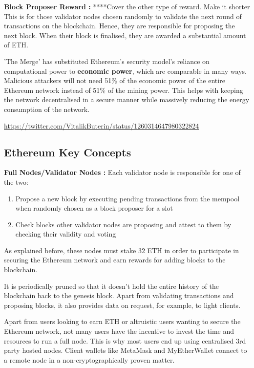 \textbf{Block Proposer Reward :}
****Cover the other type of reward. Make it shorter
This is for those validator nodes chosen randomly to validate the next round of transactions on the blockchain. Hence, they are responsible for proposing the next block. When their block is finalised, they are awarded a substantial amount of ETH.


'The Merge' has substituted Ethereum's security model's reliance on computational power to \textbf{economic power}, which are comparable in many ways. Malicious attackers will not need 51\% of the economic power of the entire Ethereum network instead of 51\% of the mining power. This helps with keeping the network decentralised in a secure manner while massively reducing the energy consumption of the network. 

\url{https://twitter.com/VitalikButerin/status/1260314647980322824}



\subsection{Ethereum Key Concepts}

\textbf{Full Nodes/Validator Nodes :}
Each validator node is responsible for one of the two:
\begin{enumerate}
    \item Propose a new block by executing pending transactions from the mempool when randomly chosen as a block proposer for a slot
    \item Check blocks other validator nodes are proposing and attest to them by checking their validity and voting 
\end{enumerate}
As explained before, these nodes must stake 32 ETH in order to participate in securing the Ethereum network and earn rewards for adding blocks to the blockchain.

It is periodically pruned so that it doesn't hold the entire history of the blockchain back to the genesis block. Apart from validating transactions and proposing blocks, it also provides data on request, for example, to light clients.

Apart from users looking to earn ETH or altruistic users wanting to secure the Ethereum network, not many users have the incentive to invest the time and resources to run a full node. This is why most users end up using centralised 3rd party hosted nodes. Client wallets like MetaMask and MyEtherWallet connect to a remote node in a non-cryptographically proven matter. 

